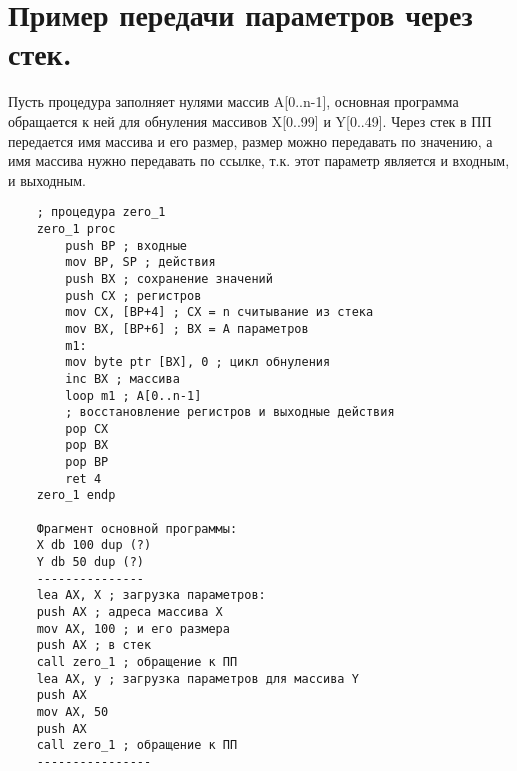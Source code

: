 \section{Пример передачи параметров через стек.}

Пусть процедура заполняет нулями массив A[0..n-1], основная программа обращается к ней для обнуления массивов X[0..99] и Y[0..49]. Через стек в ПП передается имя массива и его размер, размер можно передавать по значению,
а имя массива нужно передавать по ссылке, т.к. этот параметр является и входным, и выходным.
\begin{verbatim}
    ; процедура zero_1
    zero_1 proc
        push BP ; входные
        mov BP, SP ; действия
        push BX ; сохранение значений
        push CX ; регистров
        mov CX, [BP+4] ; СХ = n считывание из стека
        mov BX, [BP+6] ; ВХ = А параметров
        m1:
        mov byte ptr [BX], 0 ; цикл обнуления
        inc BX ; массива
        loop m1 ; A[0..n-1]
        ; восстановление регистров и выходные действия
        pop CX
        pop BX
        pop BP
        ret 4
    zero_1 endp

    Фрагмент основной программы:
    X db 100 dup (?)
    Y db 50 dup (?)
    ---------------
    lea AX, X ; загрузка параметров:
    push AX ; адреса массива Х
    mov AX, 100 ; и его размера
    push AX ; в стек
    call zero_1 ; обращение к ПП
    lea AX, y ; загрузка параметров для массива Y
    push AX
    mov AX, 50
    push AX
    call zero_1 ; обращение к ПП
    ----------------
\end{verbatim}

